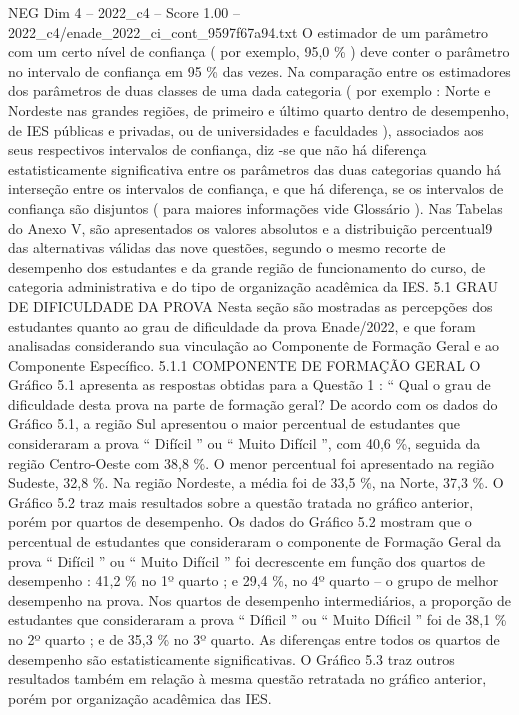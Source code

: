 \begin{textsample}{NEG Dim 4 – 2022\_c4 – Score 1.00 – 2022\_c4/enade\_2022\_ci\_cont\_9597f67a94.txt}
O estimador de um parâmetro com um certo nível de confiança ( por exemplo, 95,0 \% ) deve conter o parâmetro no intervalo de confiança em 95 \% das vezes.
Na comparação entre os estimadores dos parâmetros de duas classes de uma dada categoria ( por exemplo : Norte e Nordeste nas grandes regiões, de primeiro e último quarto dentro de desempenho, de IES públicas e privadas, ou de universidades e faculdades ), associados aos seus respectivos intervalos de confiança, diz -se que não há diferença estatisticamente significativa entre os parâmetros das duas categorias quando há interseção entre os intervalos de confiança, e que há diferença, se os intervalos de confiança são disjuntos ( para maiores informações vide Glossário ).
Nas Tabelas do Anexo V, são apresentados os valores absolutos e a distribuição percentual9 das alternativas válidas das nove questões, segundo o mesmo recorte de desempenho dos estudantes e da grande região de funcionamento do curso, de categoria administrativa e do tipo de organização acadêmica da IES. 5.1 GRAU DE DIFICULDADE DA PROVA Nesta seção são mostradas as percepções dos estudantes quanto ao grau de dificuldade da prova Enade/2022, e que foram analisadas considerando sua vinculação ao Componente de Formação Geral e ao Componente Específico. 5.1.1 COMPONENTE DE FORMAÇÃO GERAL O Gráfico 5.1 apresenta as respostas obtidas para a Questão 1 : “ Qual o grau de dificuldade desta prova na parte de formação geral?
De acordo com os dados do Gráfico 5.1, a região Sul apresentou o maior percentual de estudantes que consideraram a prova “ Difícil ” ou “ Muito Difícil ”, com 40,6 \%, seguida da região Centro-Oeste com 38,8 \%.
O menor percentual foi apresentado na região Sudeste, 32,8 \%.
Na região Nordeste, a média foi de 33,5 \%, na Norte, 37,3 \%.
O Gráfico 5.2 traz mais resultados sobre a questão tratada no gráfico anterior, porém por quartos de desempenho.
Os dados do Gráfico 5.2 mostram que o percentual de estudantes que consideraram o componente de Formação Geral da prova “ Difícil ” ou “ Muito Difícil ” foi decrescente em função dos quartos de desempenho : 41,2 \% no 1º quarto ; e 29,4 \%, no 4º quarto – o grupo de melhor desempenho na prova.
Nos quartos de desempenho intermediários, a proporção de estudantes que consideraram a prova “ Díficil ” ou “ Muito Díficil ” foi de 38,1 \% no 2º quarto ; e de 35,3 \% no 3º quarto.
As diferenças entre todos os quartos de desempenho são estatisticamente significativas.
O Gráfico 5.3 traz outros resultados também em relação à mesma questão retratada no gráfico anterior, porém por organização acadêmica das IES.

\end{textsample}

